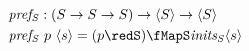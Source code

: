 \documentclass[preview]{standalone}
\begin{document}
\begin{align*}%
    \mathit{pref_S} &: (S \rightarrow S \rightarrow S) \rightarrow \vect{S} \rightarrow \vect{S}\\
    \mathit{pref_S} &\ p\ \vect{s} = (p \redS) \fMapS \mathit{inits_S} \vect{s}%
\end{align*}
\end{document}
